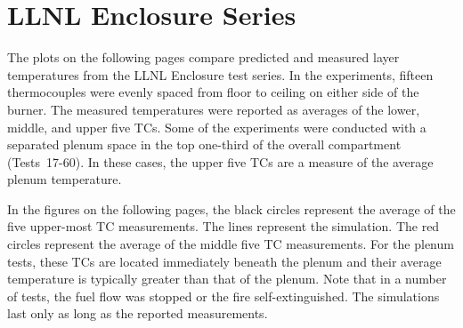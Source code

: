 \clearpage

\section{LLNL Enclosure Series}

The plots on the following pages compare predicted and measured layer temperatures from the LLNL Enclosure test series. In the experiments, fifteen thermocouples were evenly spaced from floor to ceiling on either side of the burner. The measured temperatures were reported as averages of the lower, middle, and upper five TCs. Some of the experiments were conducted with a separated plenum space in the top one-third of the overall compartment (Tests~17-60). In these cases, the upper five TCs are a measure of the average plenum temperature.

In the figures on the following pages, the black circles represent the average of the five upper-most TC measurements. The lines represent the simulation. The red circles represent the average of the middle five TC measurements. For the plenum tests, these TCs are located immediately beneath the plenum and their average temperature is typically greater than that of the plenum. Note that in a number of tests, the fuel flow was stopped or the fire self-extinguished. The simulations last only as long as the reported measurements.

